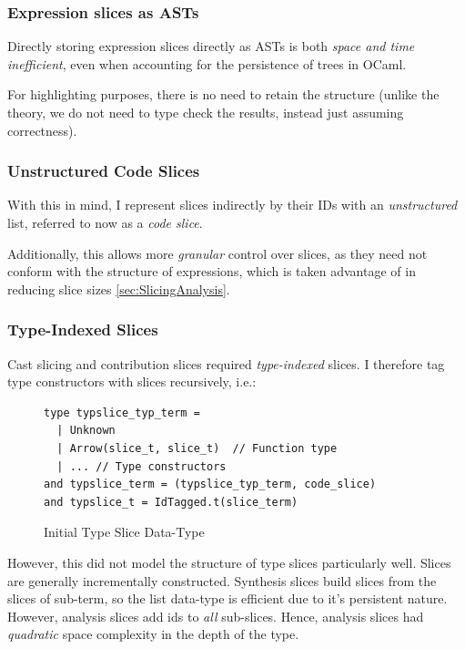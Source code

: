 \subsubsection{Expression slices as ASTs}

Directly storing expression slices directly as ASTs is both \textit{space and time inefficient}, even when accounting for the persistence \cite[ch. 2]{PurelyFunctionalDataStructures} of trees in OCaml. 

For highlighting purposes, there is no need to retain the structure (unlike the theory, we do not need to type check the results, instead just assuming correctness). 

\subsubsection{Unstructured Code Slices}
\label{sec:UnstructuredSlices}
With this in mind, I represent slices indirectly by their IDs with an \textit{unstructured} list, referred to now as a \textit{code slice}.

Additionally, this allows more \textit{granular} control over slices, as they need not conform with the structure of expressions, which is taken advantage of in reducing slice sizes \cref{sec:SlicingAnalysis}.

\subsubsection{Type-Indexed Slices}
Cast slicing and contribution slices required \textit{type-indexed} slices. I therefore tag type constructors with slices recursively, i.e.:

\begin{figure}[h]
\begin{verbatim}
type typslice_typ_term = 
  | Unknown
  | Arrow(slice_t, slice_t)  // Function type
  | ... // Type constructors
and typslice_term = (typslice_typ_term, code_slice)
and typslice_t = IdTagged.t(slice_term)
\end{verbatim}
\caption{Initial Type Slice Data-Type}
\end{figure}

However, this did not model the structure of type slices particularly well. Slices are generally incrementally constructed. Synthesis slices build slices from the slices of sub-term, so the list data-type is efficient due to it's persistent nature. However, analysis slices add ids to \textit{all} sub-slices. Hence, analysis slices had \textit{quadratic} space complexity in the depth of the type.

